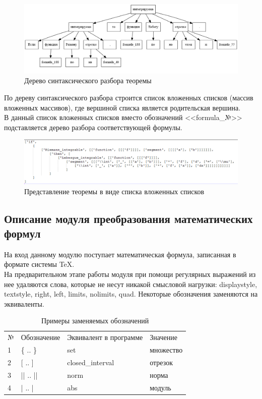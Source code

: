 \documentclass[12pt]{article}
\begin{document}
\begin{figure}
\includegraphics[scale=0.43]{Picture_2.png}
\caption{Дерево синтаксического разбора теоремы }
\end{figure}

По дереву синтаксического разбора строится список вложенных списков (массив вложенных массивов), где вершиной списка является родительская вершина. \\

В данный список вложенных списков  вместо  обозначений <<formula\_№>> подставляется дерево разбора соответствующей формулы. 

\begin{figure}
\includegraphics[scale=0.63]{Picture_3.png}
\caption{Представление теоремы в виде списка вложенных списков }
\end{figure}

\subsection{Описание модуля преобразования математических формул}
На вход данному модулю поступает математическая формула, записанная в формате системы TeX.\\

 На предварительном этапе работы модуля при помощи регулярных выражений из нее удаляются слова, которые не несут никакой смысловой нагрузки:
displaystyle, textstyle, right, left, limits, nolimits, quad. Некоторые обозначения заменяются на эквиваленты.

\begin{table}[h!]
\begin{tabular}{ l l l l}
№ & Обозначение & Эквивалент в программе & Значение  \\
1 & \{ .. \} & set  & множество\\
2 & [ .. ] & closed\_interval  & отрезок \\
3 & || .. || & norm & норма \\
4 & | .. | & abs & модуль \\

\end{tabular}
\label{table:satellites}
  \caption{Примеры заменяемых обозначений}
\end{table} 
\end{document}
